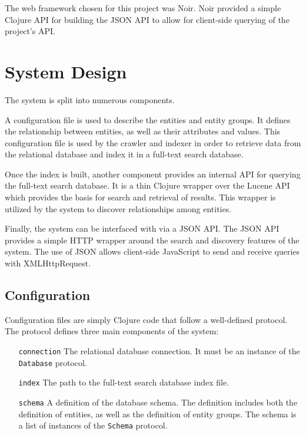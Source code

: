 \documentclass[12pt,letterpaper,oneside]{report}
\theoremstyle{definition}
\begin{document}
				The web framework chosen for this project was Noir.  Noir provided a simple Clojure API for building the JSON API to allow for client-side querying of the project's API.
			
		\section{System Design}
			The system is split into numerous components.
			
			A configuration file is used to describe the entities and entity groups.  It defines the relationship between entities, as well as their attributes and values.  This configuration file is used by the crawler and indexer in order to retrieve data from the relational database and index it in a full-text search database.
			
			Once the index is built, another component provides an internal API for querying the full-text search database.  It is a thin Clojure wrapper over the Lucene API which provides the basis for search and retrieval of results.  This wrapper is utilized by the system to discover relationships among entities.
			
			Finally, the system can be interfaced with via a JSON API.  The JSON API provides a simple HTTP wrapper around the search and discovery features of the system.  The use of JSON allows client-side JavaScript to send and receive queries with XMLHttpRequest.
			
			
			\subsection{Configuration}
				Configuration files are simply Clojure code that follow a well-defined protocol.  The protocol defines three main components of the system:
				
				\begin{itemize}
					\item[\texttt{connection}] The relational database connection.  It must be an instance of the \texttt{Database} protocol.
					\item[\texttt{index}] The path to the full-text search database index file.
					\item[\texttt{schema}] A definition of the database schema.  The definition includes both the definition of entities, as well as the definition of entity groups.  The schema is a list of instances of the \texttt{Schema} protocol.
				\end{itemize}
				
\end{document}
